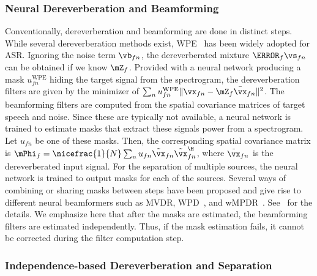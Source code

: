 \documentclass[a4paper]{article}
\begin{document}
\subsubsection{Neural Dereverberation and Beamforming}

Conventionally, dereverberation and beamforming are done in distinct steps.
While several dereverberation methods exist, WPE~\cite{nakataniSpeechDereverberationBased2010} has been widely adopted for ASR.
Ignoring the noise term $\vb_{fn}$, the dereverberated mixture $\mA_f \vs_{fn}$ can be obtained if we know $\mZ_f$.
Provided with a neural network producing a mask $u^{\text{WPE}}_{fn}$ hiding the target signal from the spectrogram, the dereverberation filters are given by the minimizer of
$\sum_n u_{fn}^{\text{WPE}} \| \vx_{fn} - \mZ_f \bar{\vx}_{fn}\|^2$.
The beamforming filters are computed from the spatial covariance matrices of target speech and noise.
Since these are typically not available, a neural network is trained to estimate masks that extract these signals power from a spectrogram.
Let $u_{fn}$ be one of these masks.
Then, the corresponding spatial covariance matrix is $\mPhi_f = \nicefrac{1}{N}\sum_n u_{fn} \tilde{\vx}_{fn} \tilde{\vx}_{fn}^\H$, where $\tilde{\vx}_{fn}$ is the dereverberated input signal.
For the separation of multiple sources, the neural network is trained to output masks for each of the sources.
Several ways of combining or sharing masks between steps have been proposed and give rise to different neural beamformers such as MVDR, WPD~\cite{nakataniUnifiedConvolutionalBeamformer2019}, and wMPDR~\cite{nakataniJointlyOptimalDenoising2020}.
See~\cite{zhangEndtoEndFarFieldSpeech2020} for the details.
We emphasize here that after the masks are estimated, the beamforming filters are estimated independently.
Thus, if the mask estimation fails, it cannot be corrected during the filter computation step.

\subsubsection{Independence-based Dereverberation and Separation}
\end{document}
